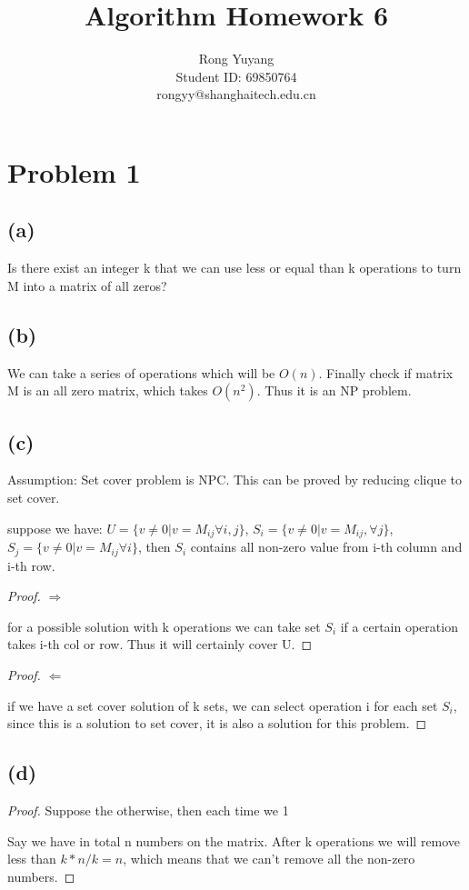 \documentclass{article}
\title{Algorithm Homework 6}
\author{Rong Yuyang \\ Student ID: 69850764 \\ rongyy@shanghaitech.edu.cn}
\begin{document}
\maketitle

\section*{Problem 1}
\subsection*{(a)}
	Is there exist an integer k that we can use less or equal than k operations to turn M into a matrix of all zeros?
\subsection*{(b)}
	We can take a series of operations which will be $O(n)$. Finally check if matrix M is an all zero matrix, which takes $O(n^2)$. Thus it is an NP problem.

\subsection*{(c)}
	Assumption: Set cover problem is NPC. This can be proved by reducing clique to set cover.
	\par suppose we have: $U = \{v \neq 0 | v = M_{ij} \forall i,j\}$, $S_i = \{v \neq 0 | v = M_{ij}, \forall j \}$, $S_j = \{v \neq 0 | v = M_{ij} \forall i\}$, then $S_i$ contains all non-zero value from i-th column and i-th row.
	\begin{proof} $\Rightarrow$
	\par for a possible solution with k operations we can take set $S_i$ if a certain operation takes i-th col or row. Thus it will certainly cover U.
	\end{proof}
	\begin{proof} $\Leftarrow$
	\par if we have a set cover solution of k sets, we can select operation i for each set $S_i$, since this is a solution to set cover, it is also a solution for this problem.
	\end{proof}
\subsection*{(d)}
	\begin{proof}
	 Suppose the otherwise, then each time we 1 
	 \par Say we have in total n numbers on the matrix. After k operations we will remove less than $k * n/k = n$, which means that we can't remove all the non-zero numbers.
	\end{proof}
\end{document}
